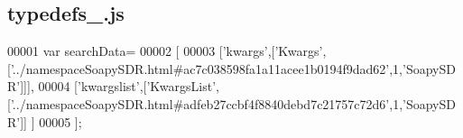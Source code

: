 \subsection{typedefs\+\_.\+js}
\label{typedefs__3_8js_source}

\begin{DoxyCode}
00001 var searchData=
00002 [
00003   [\textcolor{stringliteral}{'kwargs'},[\textcolor{stringliteral}{'Kwargs'},[\textcolor{stringliteral}{'../namespaceSoapySDR.html#ac7c038598fa1a11acee1b0194f9dad62'},1,\textcolor{stringliteral}{'SoapySDR'}]]],
00004   [\textcolor{stringliteral}{'kwargslist'},[\textcolor{stringliteral}{'KwargsList'},[\textcolor{stringliteral}{'../namespaceSoapySDR.html#adfeb27ccbf4f8840debd7c21757c72d6'},1,\textcolor{stringliteral}{'SoapySDR'}]]
      ]
00005 ];
\end{DoxyCode}

